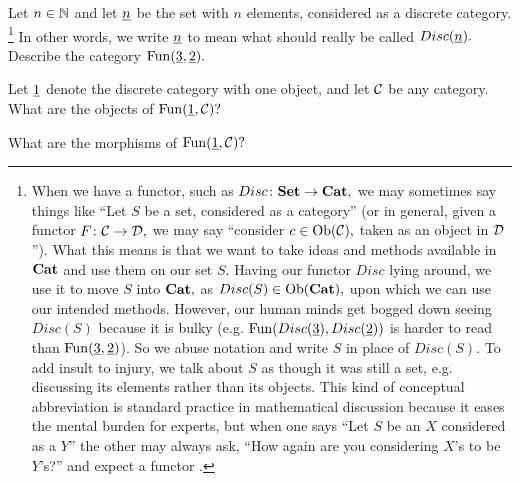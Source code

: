 \documentclass[../main/CT4S-EN-RU]{subfiles}
\begin{document}
\begin{exerciseENG}
Let $n\in{\mathbb N}$ and let $\underline{n}$ be the set with $n$ elements, considered as a discrete category.
\footnote{When we have a functor, such as $Disc\colon{\mathbf{Set}}\rightarrow{\mathbf{Cat}},$ we may sometimes say things like “Let $S$ be a set, considered as a category” (or in general, given a functor $F\colon\mathcal{C}\rightarrow\mathcal{D},$ we may say “consider $c\in\operatorname{Ob}(\mathcal{C}),$ taken as an object in $\mathcal{D}$”). What this means is that we want to take ideas and methods available in ${\mathbf{Cat}}$ and use them on our set $S.$ Having our functor $Disc$ lying around, we use it to move $S$ into ${\mathbf{Cat}},$ as $Disc(S)\in\operatorname{Ob}({\mathbf{Cat}}),$ upon which we can use our intended methods. However, our human minds get bogged down seeing $Disc(S)$ because it is bulky (e.g. $\operatorname{Fun}(Disc(\underline{3}),Disc(\underline{2}))$ is harder to read than $\operatorname{Fun}(\underline{3},\underline{2})$). So we abuse notation and write $S$ in place of  $Disc(S).$ To add insult to injury, we talk about $S$ as though it was still a set, e.g. discussing its elements rather than its objects. This kind of conceptual abbreviation is standard practice in mathematical discussion because it eases the mental burden for experts, but when one says “Let $S$ be an $X$ considered as a $Y$” the other may always ask, “How again are you considering $X$'s to be $Y$'s?” and expect a functor .}
In other words, we write $\underline{n}$ to mean what should really be called $Disc(\underline{n}).$ Describe the category $\operatorname{Fun}(\underline{3},\underline{2}).$
\end{exerciseENG}

\begin{exerciseRUS}
\end{exerciseRUS}

\begin{exerciseENG}
Let $\underline{1}$ denote the discrete category with one object, and let $\mathcal{C}$ be any category.
\sexc What are the objects of $\operatorname{Fun}(\underline{1},\mathcal{C})?$
\item What are the morphisms of $\operatorname{Fun}(\underline{1},\mathcal{C})?$
\endsexc
\end{exerciseENG}

\begin{exerciseRUS}
\end{exerciseRUS}
\end{document}
